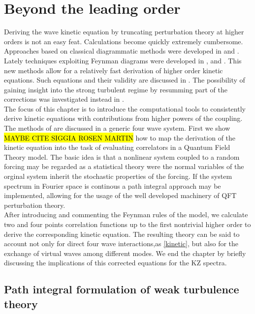 
\newpage
\vphantom{}
\section{Beyond the leading order}
Deriving the wave kinetic equation by truncating perturbation theory at higher orders is not an easy feat. Calculations become quickly extremely cumbersome. Approaches 
based on classical diagrammatic methods were developed in \cite{Zakharov1975} and \cite{Gurarie:1994ut}. Lately techniques exploiting Feynman diagrams were developed in
\cite{Rosenhaus2023}, \cite{Rosenhaus:2022uwa} and \cite{Rosenhaus:2023sik}. This new methods allow for a relatively fast derivation of higher order kinetic equations.
Such equations and their validity are discussed in \cite{Rosenhaus:2023pdj}. The possibility of gaining insight into the strong turbulent regime by resumming 
part of the corrections was investigated instead in \cite{Rosenhaus:2025mgj}. \\
The focus of this chapter is to introduce the computational tools to consistently derive kinetic equations with contributions from higher powers of the coupling. 
The methods of \cite{Rosenhaus2023} are discussed in a generic four wave system. First we show \hl{MAYBE CITE SIGGIA ROSEN MARTIN} how to map the derivation of the kinetic equation into
the task of evaluating correlators in a Quantum Field Theory model. The basic idea is that a nonlinear system coupled to a random forcing may be regarded as 
a statistical theory were the normal variables of the orginal system inherit the stochastic properties of the forcing. If the system spectrum in Fourier space is continous
a path integral approach may be implemented, allowing for the usage of the well developed machinery of QFT perturbation theory.\\
After introducing and commenting the Feynman rules of the model, we calculate two and four points 
correlation functions up to the first nontrivial higher order to derive the corresponding kinetic equation. The resulting theory can be said to account 
not only for direct four wave interactions,as \eqref{kinetic}, but also for the exchange of virtual waves among different modes. We end the chapter by briefly discussing the implications
of this corrected equations for the KZ spectra. \\  
\subsection{Path integral formulation of weak turbulence theory}

